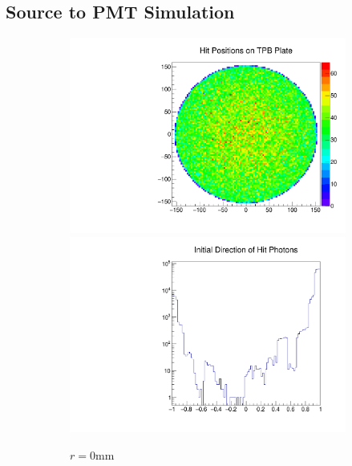 \documentclass[aps,pra,notitlepage,groupedaddress]{revtex4-1}
\begin{document}
\subsection{Source to PMT Simulation}

\begin{figure}
	\begin{center}
	\begin{subfigure}{0.32\textwidth}
		\begin{minipage}{1.0\textwidth}
			\includegraphics[width=1.0\textwidth]{figures/hit_0.pdf}
			\includegraphics[width=1.0\textwidth]{figures/init_0.pdf}
		\end{minipage}
		\caption{$r=0$mm}
	\end{subfigure}
	\begin{subfigure}{0.32\textwidth}
		\begin{minipage}{1.0\textwidth}

\end{minipage}
\end{subfigure}
\end{center}
\end{figure}
\end{document}
